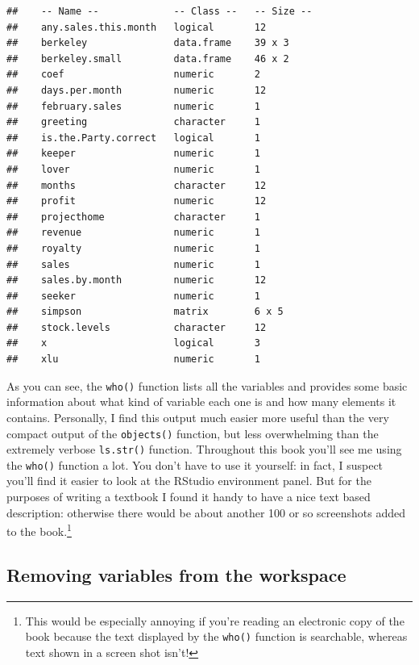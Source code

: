 \documentclass[
]{book}
\begin{document}
\begin{verbatim}
##    -- Name --             -- Class --   -- Size --
##    any.sales.this.month   logical       12        
##    berkeley               data.frame    39 x 3    
##    berkeley.small         data.frame    46 x 2    
##    coef                   numeric       2         
##    days.per.month         numeric       12        
##    february.sales         numeric       1         
##    greeting               character     1         
##    is.the.Party.correct   logical       1         
##    keeper                 numeric       1         
##    lover                  numeric       1         
##    months                 character     12        
##    profit                 numeric       12        
##    projecthome            character     1         
##    revenue                numeric       1         
##    royalty                numeric       1         
##    sales                  numeric       1         
##    sales.by.month         numeric       12        
##    seeker                 numeric       1         
##    simpson                matrix        6 x 5     
##    stock.levels           character     12        
##    x                      logical       3         
##    xlu                    numeric       1
\end{verbatim}

As you can see, the \texttt{who()} function lists all the variables and provides some basic information about what kind of variable each one is and how many elements it contains. Personally, I find this output much easier more useful than the very compact output of the \texttt{objects()} function, but less overwhelming than the extremely verbose \texttt{ls.str()} function. Throughout this book you'll see me using the \texttt{who()} function a lot. You don't have to use it yourself: in fact, I suspect you'll find it easier to look at the RStudio environment panel. But for the purposes of writing a textbook I found it handy to have a nice text based description: otherwise there would be about another 100 or so screenshots added to the book.\footnote{This would be especially annoying if you're reading an electronic copy of the book because the text displayed by the \texttt{who()} function is searchable, whereas text shown in a screen shot isn't!}

\hypertarget{removing-variables-from-the-workspace}{%
\subsection{Removing variables from the workspace}\label{removing-variables-from-the-workspace}}
\end{document}

